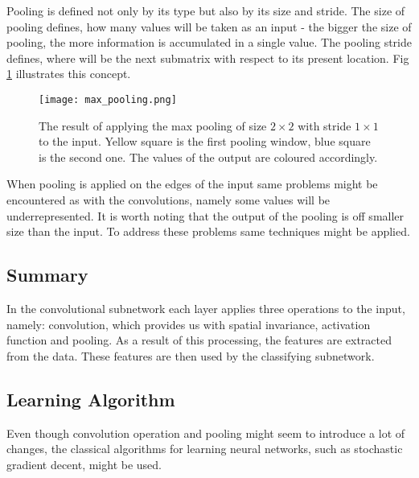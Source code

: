 \documentclass[a4paper,10pt]{report}
\begin{document}
	  
	  Pooling is defined not only by its type but also by its size and stride. The size of pooling defines, how many values will be taken as an input - the bigger the size of pooling, the more information is accumulated in a single value. The pooling stride defines, where will be the next submatrix with respect to its present location. Fig \ref{fig:max_pooling} illustrates this concept.\\
	  
	  \begin{figure}[h!]
	    \centering
	    \texttt{[image: max\_pooling.png]}
	    \caption{The result of applying the max pooling of size $2\times2$ with stride $1\times1$ to the input. Yellow square is the first pooling window, blue square is the second one. The values of the output are coloured accordingly.}
	    \label{fig:max_pooling}
	  \end{figure} 
  
	  When pooling is applied on the edges of the input same problems might be encountered as with the convolutions, namely some values will be underrepresented. It is worth noting that the output of the pooling is off smaller size than the input. To address these problems same techniques might be applied.\\
	  
	   
	
	\subsection{Summary} %
	  In the convolutional subnetwork each layer applies three operations to the input, namely: convolution, which provides us with spatial invariance, activation function and pooling. As a result of this processing, the features are extracted from the data. These features are then used by the classifying subnetwork.\\
	  	  
      
      
      \subsection{Learning Algorithm} %
      Even though convolution operation and pooling might seem to introduce a lot of changes, the classical algorithms for learning neural networks, such as stochastic gradient decent, might be used.    
	
\end{document}
